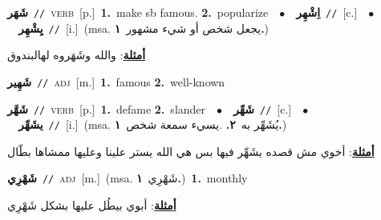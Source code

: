 \documentclass[10pt,a4paper,twoside]{article} %
\begin{document}
\begin{multicols}{2}
{\setlength\topsep{0pt}\textbf{\foreignlanguage{arabic}{شَهَر}}\ {\color{gray}\texttt{//}\color{black}}\ \textsc{verb}\ [p.]\ \textbf{1.}~make sb famous.  \textbf{2.}~popularize\ \ $\bullet$\ \ \setlength\topsep{0pt}\textbf{\foreignlanguage{arabic}{اِشْهِر}}\ {\color{gray}\texttt{//}\color{black}}\ [c.]\ \ $\bullet$\ \ \setlength\topsep{0pt}\textbf{\foreignlanguage{arabic}{يِشْهِر}}\ {\color{gray}\texttt{//}\color{black}}\ [i.]\ \color{gray}(msa. \foreignlanguage{arabic}{يجعل شخص أو شيء مشهور}~\foreignlanguage{arabic}{\textbf{١.}})\color{black}\  \begin{flushright}\color{gray}\foreignlanguage{arabic}{\textbf{\underline{\foreignlanguage{arabic}{أمثلة}}}: والله وشَهَروه لهالبندوق}\end{flushright}\color{black}} \vspace{2mm}

{\setlength\topsep{0pt}\textbf{\foreignlanguage{arabic}{شَهِير}}\ {\color{gray}\texttt{//}\color{black}}\ \textsc{adj}\ [m.]\ \textbf{1.}~famous  \textbf{2.}~well-known\ } \vspace{2mm}

{\setlength\topsep{0pt}\textbf{\foreignlanguage{arabic}{شَهَّر}}\ {\color{gray}\texttt{//}\color{black}}\ \textsc{verb}\ [p.]\ \textbf{1.}~defame  \textbf{2.}~slander\ \ $\bullet$\ \ \setlength\topsep{0pt}\textbf{\foreignlanguage{arabic}{شَهِّر}}\ {\color{gray}\texttt{//}\color{black}}\ [c.]\ \ $\bullet$\ \ \setlength\topsep{0pt}\textbf{\foreignlanguage{arabic}{يشَهِّر}}\ {\color{gray}\texttt{//}\color{black}}\ [i.]\ \color{gray}(msa. \foreignlanguage{arabic}{يُشَهِّر به}~\foreignlanguage{arabic}{\textbf{٢.}}  .\foreignlanguage{arabic}{يسيء سمعة شخص}~\foreignlanguage{arabic}{\textbf{١.}})\color{black}\  \begin{flushright}\color{gray}\foreignlanguage{arabic}{\textbf{\underline{\foreignlanguage{arabic}{أمثلة}}}: أخوي مش قصده يشَهِّر فيها بس هي الله يستر علينا وعليها ممشاها بطّال}\end{flushright}\color{black}} \vspace{2mm}

{\setlength\topsep{0pt}\textbf{\foreignlanguage{arabic}{شَهْرِي}}\ {\color{gray}\texttt{//}\color{black}}\ \textsc{adj}\ [m.]\ \color{gray}(msa. \foreignlanguage{arabic}{شَهْرِي}~\foreignlanguage{arabic}{\textbf{١.}})\color{black}\ \textbf{1.}~monthly\  \begin{flushright}\color{gray}\foreignlanguage{arabic}{\textbf{\underline{\foreignlanguage{arabic}{أمثلة}}}: أبوي بيطُل عليها بشكل شَهْرِي}\end{flushright}\color{black}} \vspace{2mm}


\end{multicols}
\end{document}
